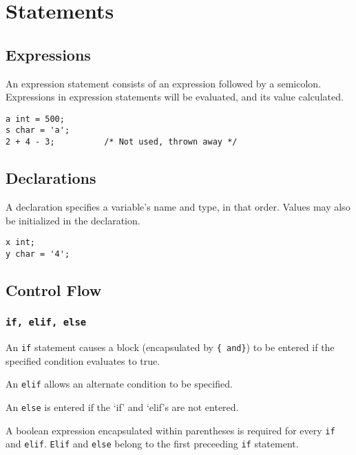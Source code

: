 \section{Statements}

    \subsection{Expressions}
        An expression statement consists of an expression followed by a semicolon. Expressions in expression statements will be evaluated, and its value calculated.

        \begin{lstlisting}
a int = 500;
s char = 'a';
2 + 4 - 3;          /* Not used, thrown away */
        \end{lstlisting}


    \subsection{Declarations}
        A declaration specifies a variable's name and type, in that order. Values may also be initialized in the declaration.

        \begin{lstlisting}
x int;
y char = '4';
        \end{lstlisting}

    \subsection{Control Flow}

        \subsubsection{\texttt{if, elif, else}}
            An \texttt{if} statement causes a block (encapsulated by \texttt{\{ and\}}) to be entered if the specified condition evaluates to true.

            \vspace{5mm}
            \noindent An \texttt{elif} allows an alternate condition to be specified.
            
            \vspace{5mm}
            \noindent An \texttt{else} is entered if the `if' and `elif's are not entered. 
           
           \vspace{5mm}
            \noindent A boolean expression encapsulated within parentheses is required for every \texttt{if} and \texttt{elif}. \texttt{Elif} and \texttt{else} belong to the first preceeding \texttt{if} statement. 


